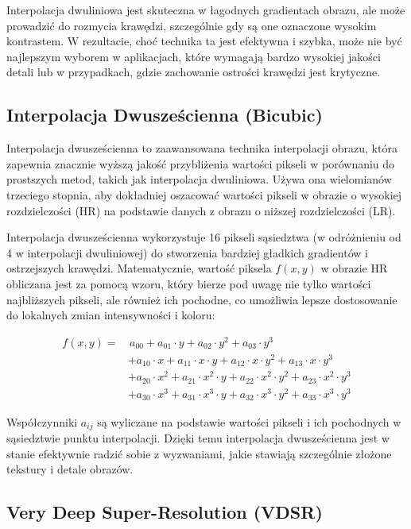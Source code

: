 \documentclass[10pt]{article}
\begin{document}
Interpolacja dwuliniowa jest skuteczna w łagodnych gradientach obrazu, ale może prowadzić do rozmycia krawędzi, szczególnie gdy są one oznaczone wysokim kontrastem. W rezultacie, choć technika ta jest efektywna i szybka, może nie być najlepszym wyborem w aplikacjach, które wymagają bardzo wysokiej jakości detali lub w przypadkach, gdzie zachowanie ostrości krawędzi jest krytyczne.

\subsection*{Interpolacja Dwusześcienna (Bicubic)}
Interpolacja dwusześcienna to zaawansowana technika interpolacji obrazu, która zapewnia znacznie wyższą jakość przybliżenia wartości pikseli w porównaniu do prostszych metod, takich jak interpolacja dwuliniowa. Używa ona wielomianów trzeciego stopnia, aby dokładniej oszacować wartości pikseli w obrazie o wysokiej rozdzielczości (HR) na podstawie danych z obrazu o niższej rozdzielczości (LR).

Interpolacja dwusześcienna wykorzystuje 16 pikseli sąsiedztwa (w odróżnieniu od 4 w interpolacji dwuliniowej) do stworzenia bardziej gładkich gradientów i ostrzejszych krawędzi. Matematycznie, wartość piksela \( f(x, y) \) w obrazie HR obliczana jest za pomocą wzoru, który bierze pod uwagę nie tylko wartości najbliższych pikseli, ale również ich pochodne, co umożliwia lepsze dostosowanie do lokalnych zmian intensywności i koloru:

\begin{align*}
f(x, y) = & \, a_{00} + a_{01} \cdot y + a_{02} \cdot y^2 + a_{03} \cdot y^3 \\
          & + a_{10} \cdot x + a_{11} \cdot x \cdot y + a_{12} \cdot x \cdot y^2 + a_{13} \cdot x \cdot y^3 \\
          & + a_{20} \cdot x^2 + a_{21} \cdot x^2 \cdot y + a_{22} \cdot x^2 \cdot y^2 + a_{23} \cdot x^2 \cdot y^3 \\
          & + a_{30} \cdot x^3 + a_{31} \cdot x^3 \cdot y + a_{32} \cdot x^3 \cdot y^2 + a_{33} \cdot x^3 \cdot y^3
\end{align*}

Współczynniki \( a_{ij} \) są wyliczane na podstawie wartości pikseli i ich pochodnych w sąsiedztwie punktu interpolacji. Dzięki temu interpolacja dwusześcienna jest w stanie efektywnie radzić sobie z wyzwaniami, jakie stawiają szczególnie złożone tekstury i detale obrazów.

\subsection*{Very Deep Super-Resolution (VDSR)}
\end{document}

